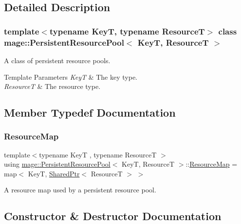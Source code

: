 \subsection{Detailed Description}
\subsubsection*{template$<$typename KeyT, typename ResourceT$>$\newline
class mage\+::\+Persistent\+Resource\+Pool$<$ Key\+T, Resource\+T $>$}

A class of persistent resource pools.


\begin{DoxyTemplParams}{Template Parameters}
{\em KeyT} & The key type. \\
\hline
{\em ResourceT} & The resource type. \\
\hline
\end{DoxyTemplParams}


\subsection{Member Typedef Documentation}
\hypertarget{classmage_1_1_persistent_resource_pool_a484a9df446865f7916d8fd2e560a3e18}{}\label{classmage_1_1_persistent_resource_pool_a484a9df446865f7916d8fd2e560a3e18} 
\subsubsection{\texorpdfstring{Resource\+Map}{ResourceMap}}
{\footnotesize\ttfamily template$<$typename KeyT , typename ResourceT $>$ \\
using \hyperlink{classmage_1_1_persistent_resource_pool}{mage\+::\+Persistent\+Resource\+Pool}$<$ KeyT, ResourceT $>$\+::\hyperlink{classmage_1_1_persistent_resource_pool_a484a9df446865f7916d8fd2e560a3e18}{Resource\+Map} =  map$<$ KeyT, \hyperlink{namespacemage_a1e01ae66713838a7a67d30e44c67703e}{Shared\+Ptr}$<$ ResourceT $>$ $>$\hspace{0.3cm}{\ttfamily [private]}}

A resource map used by a persistent resource pool. 

\subsection{Constructor \& Destructor Documentation}
\hypertarget{classmage_1_1_persistent_resource_pool_a23b83adf594628b93c368a2da7660ef8}{}\label{classmage_1_1_persistent_resource_pool_a23b83adf594628b93c368a2da7660ef8} 
